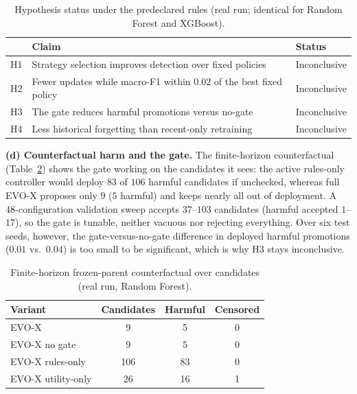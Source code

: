 \documentclass{article}
\begin{document}
\begin{table}[h]
\centering
\caption{Hypothesis status under the predeclared rules (real run; identical for Random Forest and XGBoost).}
\label{tab:hyp-full}
\small
\begin{tabular}{p{0.6cm}p{9.5cm}l}
\toprule
 & Claim & Status \\
\midrule
H1 & Strategy selection improves detection over fixed policies & Inconclusive \\
H2 & Fewer updates while macro-F1 within 0.02 of the best fixed policy & Inconclusive \\
H3 & The gate reduces harmful promotions versus no-gate & Inconclusive \\
H4 & Less historical forgetting than recent-only retraining & Inconclusive \\
\bottomrule
\end{tabular}
\end{table}

\textbf{(d) Counterfactual harm and the gate.} The finite-horizon counterfactual (Table~\ref{tab:cf-full}) shows the gate working on the candidates it sees: the active rules-only controller would deploy $83$ of $106$ harmful candidates if unchecked, whereas full EVO-X proposes only $9$ ($5$ harmful) and keeps nearly all out of deployment. A 48-configuration validation sweep accepts $37$--$103$ candidates (harmful accepted $1$--$17$), so the gate is tunable, neither vacuous nor rejecting everything. Over six test seeds, however, the gate-versus-no-gate difference in deployed harmful promotions ($0.01$ vs.\ $0.04$) is too small to be significant, which is why H3 stays inconclusive.

\begin{table}[h]
\centering
\caption{Finite-horizon frozen-parent counterfactual over candidates (real run, Random Forest).}
\label{tab:cf-full}
\small
\begin{tabular}{lccc}
\toprule
Variant & Candidates & Harmful & Censored \\
\midrule
EVO-X              & 9   & 5  & 0 \\
EVO-X no gate      & 9   & 5  & 0 \\
EVO-X rules-only   & 106 & 83 & 0 \\
EVO-X utility-only & 26  & 16 & 1 \\
\bottomrule
\end{tabular}
\end{table}
\end{document}
